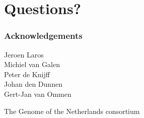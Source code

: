 \documentclass[slidestop,14pt]{beamer}
\begin{document}
\section{Questions?}


\lastpagetemplate
\begin{frame}
  \frametitle{Acknowledgements}

  \vspace{\baselineskip}

  Jeroen Laros\\
  Michiel van Galen\\
  Peter de Knijff\\
  Johan den Dunnen\\
  Gert-Jan van Ommen

  \vspace{\baselineskip}

  The Genome of the Netherlands consortium
\end{frame}
\end{document}
